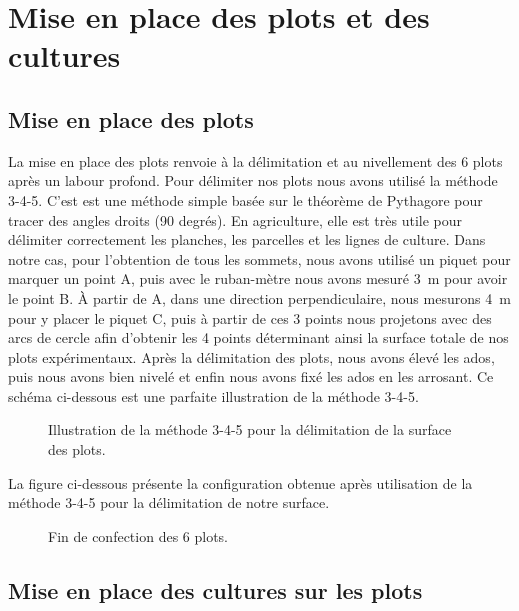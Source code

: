 \section{Mise en place des plots et des cultures}
\subsection{Mise en place des plots}
La mise en place des plots renvoie à la délimitation et au nivellement des 6 plots après un labour profond. Pour délimiter nos plots nous avons utilisé la méthode 3-4-5. C'est est une méthode simple basée sur le théorème de Pythagore pour tracer des angles droits (90 degrés). En agriculture, elle est très utile pour délimiter correctement les planches, les parcelles et les lignes de culture. Dans notre cas, pour l'obtention de tous les sommets, nous avons utilisé un piquet pour marquer un point A, puis avec le ruban-mètre nous avons mesuré 3~m pour avoir le point B. À partir de A, dans une direction perpendiculaire, nous mesurons 4~m pour y placer le piquet C, puis à partir de ces 3 points nous projetons avec des arcs de cercle afin d'obtenir les 4 points déterminant ainsi la surface totale de nos plots expérimentaux.
Après la délimitation des plots, nous avons élevé les ados, puis nous avons bien nivelé et enfin nous avons fixé les ados en les arrosant. Ce schéma ci-dessous est une parfaite illustration de la méthode 3-4-5.

\begin{figure}[H]
    \centering
    \caption{Illustration de la méthode 3-4-5 pour la délimitation de la surface des plots. }
    \label{fig:plot3-4-5}
\end{figure}

La figure ci-dessous présente la configuration obtenue après utilisation de la méthode 3-4-5 pour la délimitation de notre surface.

\begin{figure}[H]
    \centering
    \caption{Fin de confection des 6 plots. }
    \label{fig:confection3}
\end{figure}

\subsection{Mise en place des cultures sur les plots}

